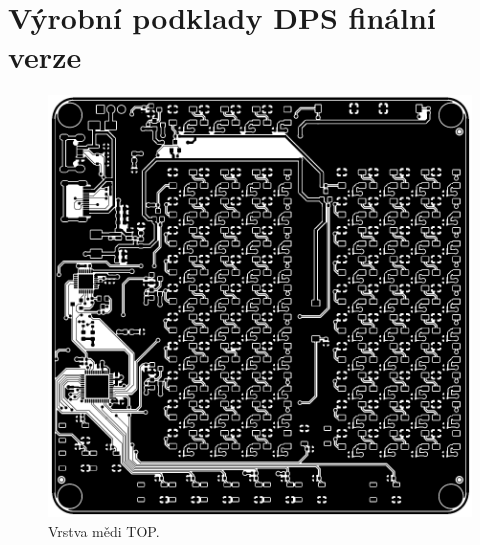 



\chapter{Výrobní podklady DPS finální verze}

  \begin{figure}[!h]
    \begin{center}
      \includegraphics[scale=0.7]{prilohy/Verze2_vrstva_Cu_TOP.png}
    \end{center}
    \caption[Vrstva mědi TOP]{Vrstva mědi TOP.}
  \end{figure}

